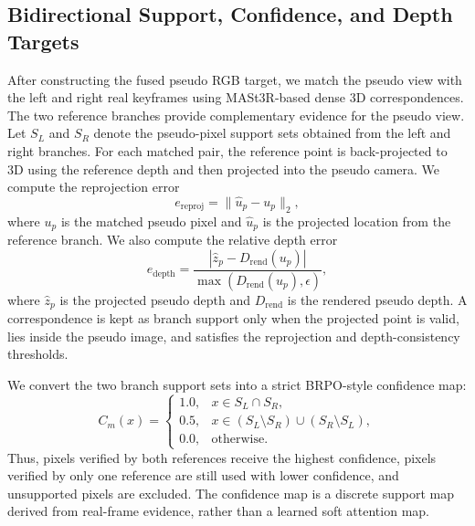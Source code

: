 \subsection{Bidirectional Support, Confidence, and Depth Targets}
\label{sec:bidirectional_support}

After constructing the fused pseudo RGB target, we match the pseudo view with the left and right real keyframes using MASt3R-based dense 3D correspondences. The two reference branches provide complementary evidence for the pseudo view. Let $S_L$ and $S_R$ denote the pseudo-pixel support sets obtained from the left and right branches. For each matched pair, the reference point is back-projected to 3D using the reference depth and then projected into the pseudo camera. We compute the reprojection error
\begin{equation}
e_{\mathrm{reproj}}=\|\hat{u}_p-u_p\|_2,
\end{equation}
where $u_p$ is the matched pseudo pixel and $\hat{u}_p$ is the projected location from the reference branch. We also compute the relative depth error
\begin{equation}
e_{\mathrm{depth}}
=
\frac{|\hat{z}_p-D_{\mathrm{rend}}(u_p)|}
{\max(D_{\mathrm{rend}}(u_p),\epsilon)} ,
\end{equation}
where $\hat{z}_p$ is the projected pseudo depth and $D_{\mathrm{rend}}$ is the rendered pseudo depth. A correspondence is kept as branch support only when the projected point is valid, lies inside the pseudo image, and satisfies the reprojection and depth-consistency thresholds.

We convert the two branch support sets into a strict BRPO-style confidence map:
\begin{equation}
C_m(x)=
\begin{cases}
1.0, & x\in S_L\cap S_R,\\
0.5, & x\in (S_L\setminus S_R)\cup(S_R\setminus S_L),\\
0.0, & \text{otherwise}.
\end{cases}
\label{eq:cm}
\end{equation}
Thus, pixels verified by both references receive the highest confidence, pixels verified by only one reference are still used with lower confidence, and unsupported pixels are excluded. The confidence map is a discrete support map derived from real-frame evidence, rather than a learned soft attention map.

